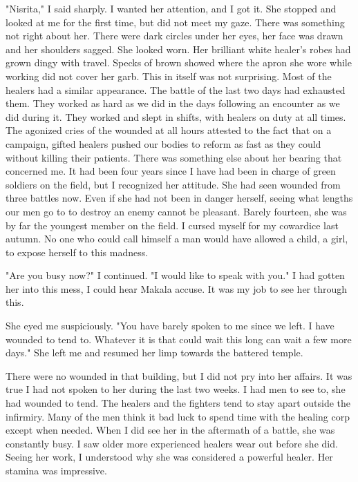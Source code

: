 \documentclass{article}
\begin{document}
"Nisrita," I said sharply. I wanted her attention, and I got it. She stopped and looked at me for the first time, but did not meet my gaze. There was something not right about her. There were dark circles under her eyes, her face was drawn and her shoulders sagged. She looked worn. Her brilliant white healer's robes had grown dingy with travel. Specks of brown showed where the apron she wore while working did not cover her garb. This in itself was not surprising. Most of the healers had a similar appearance. The battle of the last two days had exhausted them. They worked as hard as we did in the days following an encounter as we did during it. They worked and slept in shifts, with healers on duty at all times. The agonized cries of the wounded at all hours attested to the fact that on a campaign, gifted healers pushed our bodies to reform as fast as they could without killing their patients. There was something else about her bearing that concerned me. It had been four years since I have had been in charge of green soldiers on the field, but I recognized her attitude. She had seen wounded from three battles now. Even if she had not been in danger herself, seeing what lengths our men go to to destroy an enemy cannot be pleasant. Barely fourteen, she was by far the youngest member on the field. I cursed myself for my cowardice last autumn. No one who could call himself a man would have allowed a child, a girl, to expose herself to this madness.

"Are you busy now?" I continued. "I would like to speak with you." I had gotten her into this mess, I could hear Makala accuse. It was my job to see her through this.

She eyed me suspiciously. "You have barely spoken to me since we left. I have wounded to tend to. Whatever it is that could wait this long can wait a few more days." She left me and resumed her limp towards the battered temple.

There were no wounded in that building, but I did not pry into her affairs. It was true I had not spoken to her during the last two weeks. I had men to see to, she had wounded to tend. The healers and the fighters tend to stay apart outside the infirmiry. Many of the men think it bad luck to spend time with the healing corp except when needed. When I did see her in the aftermath of a battle, she was constantly busy. I saw older more experienced healers wear out before she did. Seeing her work, I understood why she was considered a powerful healer. Her stamina was impressive. 
\end{document}

